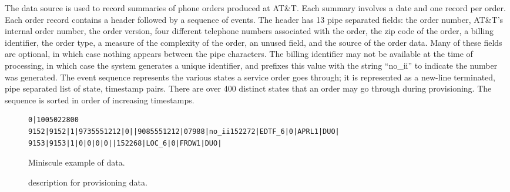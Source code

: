 The \dibbler{} data source is used to record summaries of
phone orders produced at AT\&T.  Each summary
involves a date and one record per order.
Each order record contains a header followed by a sequence of events.
The header has 13 pipe separated fields: the order number, AT\&T's
internal order number, the order version, four different telephone
numbers associated with the order, the zip code of the order, a
billing identifier, the order type, a measure of the complexity of the
order, an unused field, and the source of the order data.  Many of
these fields are optional, in which case nothing appears between the
pipe characters.  The billing identifier may not be available at the
time of processing, in which case the system generates a unique
identifier, and prefixes this value with the string ``no\_ii'' to
indicate the number was generated. The event sequence represents the
various states a service order goes through; it is represented as a
new-line terminated, pipe separated list of state, timestamp pairs.
There are over 400 distinct states that an order may go through during
provisioning.  The sequence is sorted in order of increasing timestamps. 


\begin{figure*}
\begin{small}
\begin{verbatim}
0|1005022800
9152|9152|1|9735551212|0||9085551212|07988|no_ii152272|EDTF_6|0|APRL1|DUO|
9153|9153|1|0|0|0|0||152268|LOC_6|0|FRDW1|DUO|
\end{verbatim}
\caption{Miniscule example of \dibbler{} data.}
\label{figure:dibbler-records}
\end{small}
\end{figure*}

\suppressfloats

\begin{figure}
\begin {code}

\end{code}
\caption{\datatype{} description for \dibbler{} provisioning data.}
\label{figure:dibblerml}
\end{figure}


